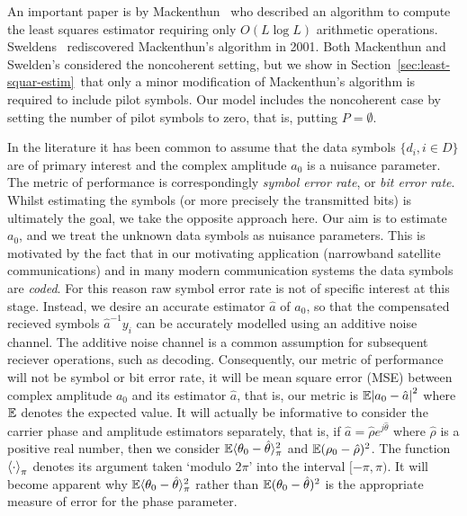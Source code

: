 \documentclass[journal]{IEEEtran}
\begin{document}
An important paper is by Mackenthun~\cite{Mackenthun1994} who described an algorithm to compute the least squares estimator requiring only $O(L \log L)$ arithmetic operations.  Sweldens~\cite{Sweldens2001} rediscovered Mackenthun's algorithm in 2001.  Both Mackenthun and Swelden's considered the noncoherent setting, but we show in Section~\ref{sec:least-squar-estim}~that only a minor modification of Mackenthun's algorithm is required to include pilot symbols. Our model includes the noncoherent case by setting the number of pilot symbols to zero, that is, putting $P = \emptyset$.  

In the literature it has been common to assume that the data symbols $\{d_i, i \in D\}$ are of primary interest and the complex amplitude $a_0$ is a nuisance parameter.  The metric of performance is correspondingly \emph{symbol error rate}, or \emph{bit error rate}.  Whilst estimating the symbols (or more precisely the transmitted bits) is ultimately the goal, we take the opposite approach here.  Our aim is to estimate $a_0$, and we treat the unknown data symbols as nuisance parameters.  This is motivated by the fact that in our motivating application (narrowband satellite communications) and in many modern communication systems the data symbols are \emph{coded}.  For this reason raw symbol error rate is not of specific interest at this stage.  Instead, we desire an accurate estimator $\hat{a}$ of $a_0$, so that the compensated recieved symbols $\hat{a}^{-1}y_i$ can be accurately modelled using an additive noise channel.  The additive noise channel is a common assumption for subsequent reciever operations, such as decoding.  Consequently, our metric of performance will not be symbol or bit error rate, it will be mean square error (MSE) between complex amplitude $a_0$ and its estimator $\hat{a}$, that is, our metric is ${\mathbb E}{\left\vert a_0 - \hat{a} \right\vert}^2$ where ${\mathbb E}$ denotes the expected value. It will actually be informative to consider the carrier phase and amplitude estimators separately, that is, if $\hat{a} = \hat{\rho}e^{j\hat{\theta}}$ where $\hat{\rho}$ is a positive real number, then we consider ${\mathbb E}\langle\theta_0 - \hat{\theta}\rangle_\pi^2$ and ${\mathbb E}(\rho_0 - \hat{\rho})^2$.  The function $\left\langle \cdot \right\rangle_\pi$ denotes its argument taken `modulo $2\pi$' into the interval $[-\pi, \pi)$.  It will become apparent why ${\mathbb E}\langle\theta_0 - \hat{\theta}\rangle_\pi^2$ rather than ${\mathbb E}(\theta_0 - \hat{\theta})^2$ is the appropriate measure of error for the phase parameter.
\end{document}
